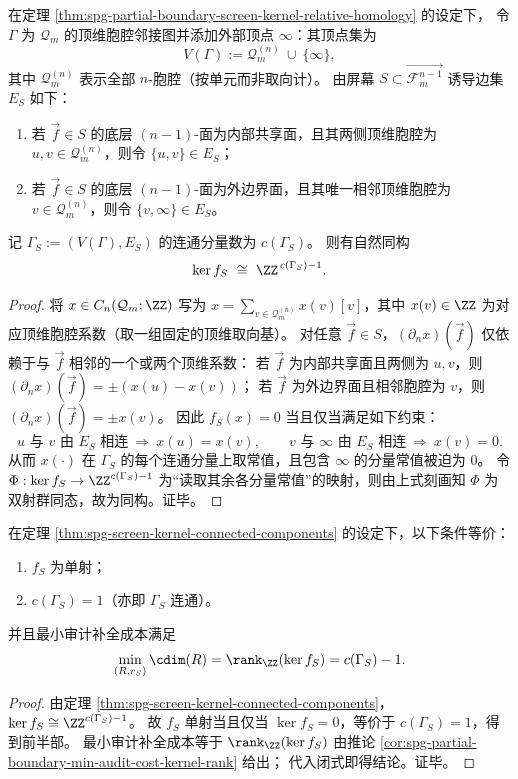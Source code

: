 \begin{theorem}[屏幕核的连通分量闭式]\label{thm:spg-screen-kernel-connected-components}
在定理 \ref{thm:spg-partial-boundary-screen-kernel-relative-homology} 的设定下，
令 \(\Gamma\) 为 \(\mathcal Q_m\) 的顶维胞腔邻接图并添加外部顶点 \(\infty\)：其顶点集为
\[
V(\Gamma):=\mathcal Q_m^{(n)}\ \cup\ \{\infty\},
\]
其中 \(\mathcal Q_m^{(n)}\) 表示全部 \(n\)-胞腔（按单元而非取向计）。
由屏幕 \(S\subset \overrightarrow{\mathcal F_{m}^{n-1}}\) 诱导边集 \(E_S\) 如下：
\begin{enumerate}
  \item 若 \(\vec f\in S\) 的底层 \((n-1)\)-面为内部共享面，且其两侧顶维胞腔为 \(u,v\in\mathcal Q_m^{(n)}\)，则令 \(\{u,v\}\in E_S\)；
  \item 若 \(\vec f\in S\) 的底层 \((n-1)\)-面为外边界面，且其唯一相邻顶维胞腔为 \(v\in\mathcal Q_m^{(n)}\)，则令 \(\{v,\infty\}\in E_S\)。
\end{enumerate}
记 \(\Gamma_S:=(V(\Gamma),E_S)\) 的连通分量数为 \(c(\Gamma_S)\)。
则有自然同构
\[
\ker f_S\ \cong\ \ZZ^{\,c(\Gamma_S)-1}.
\]
\end{theorem}
\begin{proof}
将 \(x\in C_n(\mathcal Q_m;\ZZ)\) 写为 \(x=\sum_{v\in\mathcal Q_m^{(n)}}x(v)[v]\)，其中 \(x(v)\in\ZZ\) 为对应顶维胞腔系数（取一组固定的顶维取向基）。
对任意 \(\vec f\in S\)，\((\partial_n x)(\vec f)\) 仅依赖于与 \(\vec f\) 相邻的一个或两个顶维系数：
若 \(\vec f\) 为内部共享面且两侧为 \(u,v\)，则
\(
(\partial_n x)(\vec f)=\pm(x(u)-x(v))
\)；
若 \(\vec f\) 为外边界面且相邻胞腔为 \(v\)，则
\(
(\partial_n x)(\vec f)=\pm x(v)
\)。
因此 \(f_S(x)=0\) 当且仅当满足如下约束：
\[
u\text{ 与 }v\text{ 由 }E_S\text{ 相连}\ \Longrightarrow\ x(u)=x(v),\qquad
v\text{ 与 }\infty\text{ 由 }E_S\text{ 相连}\ \Longrightarrow\ x(v)=0.
\]
从而 \(x(\cdot)\) 在 \(\Gamma_S\) 的每个连通分量上取常值，且包含 \(\infty\) 的分量常值被迫为 \(0\)。
令 \(\Phi:\ker f_S\to \ZZ^{c(\Gamma_S)-1}\) 为“读取其余各分量常值”的映射，则由上式刻画知 \(\Phi\) 为双射群同态，故为同构。证毕。
\end{proof}

\begin{corollary}[部分屏幕的唯一回放判据与最小审计补全成本闭式]\label{cor:spg-screen-injectivity-and-audit-cost-components}
在定理 \ref{thm:spg-screen-kernel-connected-components} 的设定下，以下条件等价：
\begin{enumerate}
  \item \(f_S\) 为单射；
  \item \(c(\Gamma_S)=1\)（亦即 \(\Gamma_S\) 连通）。
\end{enumerate}
并且最小审计补全成本满足
\[
\min_{(R,r_S)}\cdim(R)
=\rank_{\ZZ}(\ker f_S)
=c(\Gamma_S)-1.
\]
\end{corollary}
\begin{proof}
由定理 \ref{thm:spg-screen-kernel-connected-components}，
\(
\ker f_S\cong \ZZ^{c(\Gamma_S)-1}
\)。
故 \(f_S\) 单射当且仅当 \(\ker f_S=0\)，等价于 \(c(\Gamma_S)=1\)，得到前半部。
最小审计补全成本等于 \(\rank_{\ZZ}(\ker f_S)\) 由推论 \ref{cor:spg-partial-boundary-min-audit-cost-kernel-rank} 给出；
代入闭式即得结论。证毕。
\end{proof}

